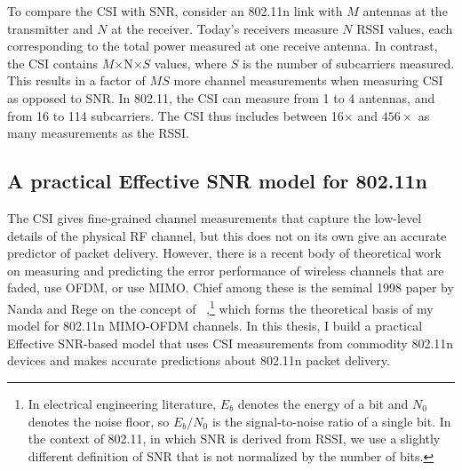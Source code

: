 To compare the CSI with SNR, consider an 802.11n link with $M$ antennas at the transmitter and $N$ at the receiver. Today's receivers measure $N$ RSSI values, each corresponding to the total power measured at one receive antenna. In contrast, the CSI contains $M$$\times$N$\times$$S$ values, where $S$ is the number of subcarriers measured. This results in a factor of $MS$ more channel measurements when measuring CSI as opposed to SNR\@. In 802.11, the CSI can measure from 1 to 4 antennas, and from 16 to 114 subcarriers. The CSI thus includes between 16$\times$ and $456\times$ as many measurements as the RSSI\@.


\subsection{A practical Effective SNR model for 802.11n}
The CSI gives fine-grained channel measurements that capture the low-level details of the physical RF channel, but this does not on its own give an accurate predictor of packet delivery. However, there is a recent body of theoretical work on measuring and predicting the error performance of wireless channels that are faded, use OFDM, or use MIMO\@. Chief among these is the seminal 1998 paper by Nanda and Rege on the concept of ~\cite{Nanda_EffectiveSNR},\footnote{In electrical engineering literature, $E_b$ denotes the energy of a bit and $N_0$ denotes the noise floor, so $E_b/N_0$ is the signal-to-noise ratio of a single bit. In the context of 802.11, in which SNR is derived from RSSI, we use a slightly different definition of SNR that is not normalized by the number of bits.} which forms the theoretical basis of my model for 802.11n MIMO-OFDM channels. In this thesis, I build a practical Effective SNR-based model that uses CSI measurements from commodity 802.11n devices and makes accurate predictions about 802.11n packet delivery.

